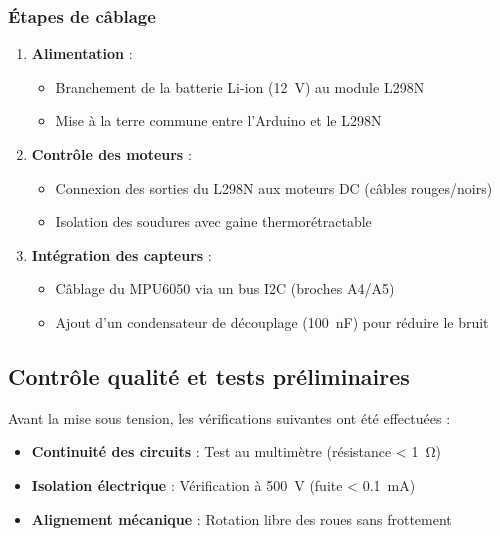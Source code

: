 \documentclass{report}
\begin{document}
\subsubsection{Étapes de câblage}
\begin{enumerate}
    \item \textbf{Alimentation} :
    \begin{itemize}
        \item Branchement de la batterie Li-ion (\SI{12}{V}) au module L298N
        \item Mise à la terre commune entre l’Arduino et le L298N
    \end{itemize}
    
    \item \textbf{Contrôle des moteurs} :
    \begin{itemize}
        \item Connexion des sorties du L298N aux moteurs DC (câbles rouges/noirs)
        \item Isolation des soudures avec gaine thermorétractable
    \end{itemize}
    
    \item \textbf{Intégration des capteurs} :
    \begin{itemize}
        \item Câblage du MPU6050 via un bus I2C (broches A4/A5)
        \item Ajout d’un condensateur de découplage (\SI{100}{nF}) pour réduire le bruit
    \end{itemize}
\end{enumerate}

\subsection{Contrôle qualité et tests préliminaires}
\label{subsec:tests_assemblage}

Avant la mise sous tension, les vérifications suivantes ont été effectuées :
\begin{itemize}
    \item \textbf{Continuité des circuits} : Test au multimètre (résistance < \SI{1}{\ohm})
    \item \textbf{Isolation électrique} : Vérification à \SI{500}{V} (fuite < \SI{0.1}{mA})
    \item \textbf{Alignement mécanique} : Rotation libre des roues sans frottement
\end{itemize}
\end{document}
